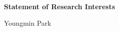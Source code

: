\documentclass[a4paper,11pt]{article}
\begin{document}
\begin{center}
\Large \textbf{Statement of Research Interests}

\Large Youngmin Park
\end{center}

% 
% 
% 
%  
%   
%  
\end{document}
